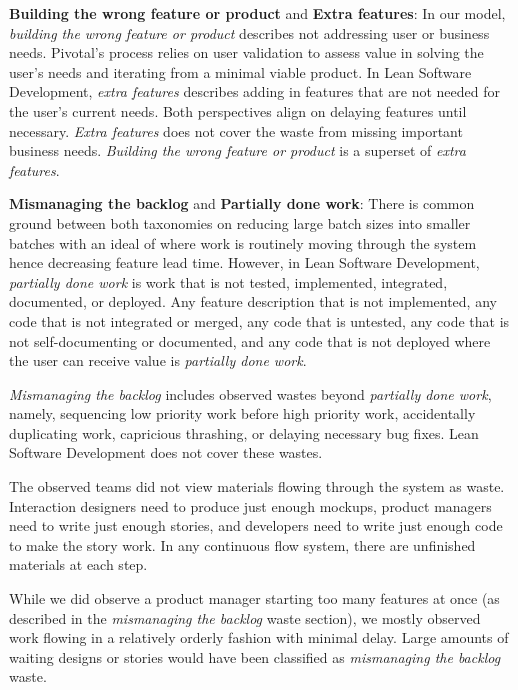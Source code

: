 \textbf{Building the wrong feature or product} and \textbf{Extra features}: In our model, \textit{building the wrong feature or product} describes not addressing user or business needs. Pivotal's process relies on user validation to assess value in solving the user's needs and iterating from a minimal viable product. In Lean Software Development, \textit{extra features} describes adding in features that are not needed for the user's current needs. Both perspectives align on delaying features until necessary. \textit{Extra features} does not cover the waste from missing important business needs. \textit{Building the wrong feature or product} is a superset of \textit{extra features}.

\textbf{Mismanaging the backlog} and \textbf{Partially done work}: There is common ground between both taxonomies on reducing large batch sizes into smaller batches with an ideal of   where work is routinely moving through the system hence decreasing feature lead time. However, in Lean Software Development, \textit{partially done work} is work that is not tested, implemented, integrated, documented, or deployed. Any feature description that is not implemented, any code that is not integrated or merged, any code that is untested, any code that is not self-documenting or documented, and any code that is not deployed where the user can receive value is \textit{partially done work}.

\textit{Mismanaging the backlog} includes observed wastes beyond \textit{partially done work}, namely,  sequencing low priority work before high priority work, accidentally duplicating work, capricious thrashing, or delaying necessary bug fixes. Lean Software Development does not cover these wastes. 

The observed teams did not view materials flowing through the system as waste. Interaction designers need to produce just enough mockups, product managers need to write just enough stories, and developers need to write just enough code to make the story work. In any continuous flow system, there are unfinished materials at each step. 

While we did observe a product manager starting too many features at once (as described in the \textit{mismanaging the backlog} waste section), we mostly observed work flowing in a relatively orderly fashion with minimal delay. Large amounts of waiting designs or stories would have been classified as \textit{mismanaging the backlog} waste.


